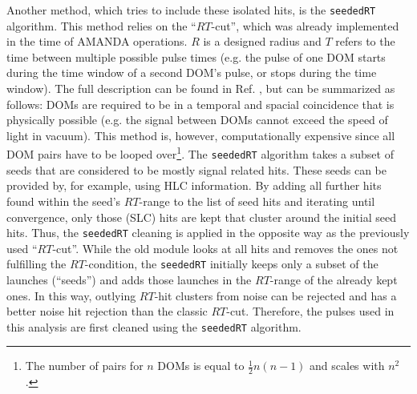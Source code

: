 Another method, which tries to include these isolated hits, is the \texttt{seededRT}  algorithm. This method relies on the ``$RT$-cut'', which was already implemented in the time of AMANDA operations. $R$ is a designed radius and $T$ refers to the time between multiple possible pulse times (e.g. the pulse of one DOM starts during the time window of a second DOM's pulse, or stops during the time window). The full description can be found in Ref. \cite{RTcutwiki}, but can be summarized as follows: DOMs are required to be in a temporal and spacial coincidence that is physically possible (e.g. the signal between DOMs cannot exceed the speed of light in vacuum). This method is, however, computationally expensive since all DOM pairs have to be looped over\footnote{The number of pairs for $n$ DOMs is equal to $\frac{1}{2}n(n-1)$ and scales with $n^2$.}. The \texttt{seededRT} algorithm takes a subset of seeds that are considered to be mostly signal related hits. These seeds can be provided by, for example, using HLC information. By adding all further hits found within the seed's $RT$-range to the list of seed hits and iterating until convergence, only those (SLC) hits are kept that cluster around the initial seed hits. Thus, the \texttt{seededRT} cleaning is applied in the opposite way as the previously used  ``$RT$-cut''. While the old module looks at all hits and removes the ones not fulfilling the $RT$-condition, the \texttt{seededRT} initially keeps only a subset of the launches (``seeds'') and adds those launches in the $RT$-range of the already kept ones. In this way, outlying $RT$-hit clusters from noise can be rejected and has a better noise hit rejection than the classic $RT$-cut. Therefore, the pulses used in this analysis are first cleaned using the \texttt{seededRT} algorithm.



